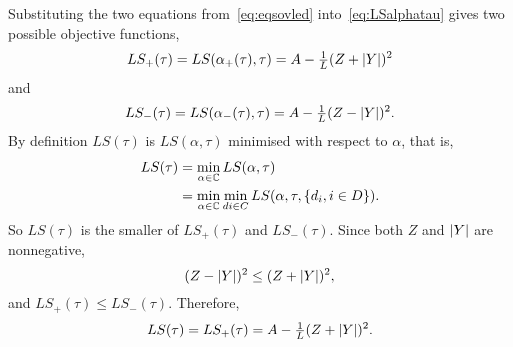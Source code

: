 \documentclass[journal]{IEEEtranTCOM}
\begin{document}
Substituting the two equations from~\eqref{eq:eqsovled} into~\eqref{eq:LSalphatau} gives two possible objective functions, %
\[
LS_+(\tau) =  LS(\alpha_+(\tau), \tau) = A - \tfrac{1}{L} (Z + {\left\vert Y \right\vert})^2
\]
and
\[
LS_-(\tau) =  LS(\alpha_{-}(\tau), \tau) = A - \tfrac{1}{L} (Z - {\left\vert Y \right\vert})^2.
\]
By definition $LS(\tau)$ is $LS(\alpha,\tau)$ minimised with respect to $\alpha$, that is,
\begin{align*}
LS(\tau) &= \min_{\alpha \in {\mathbb C}} LS(\alpha,\tau) \\
 &= \min_{\alpha \in {\mathbb C}} \min_{di \in C} LS(\alpha,\tau,\{d_i, i \in D\}).
\end{align*}
So $LS(\tau)$ is the smaller of $LS_+(\tau)$ and $LS_-(\tau)$.  Since both $Z$ and ${\left\vert Y \right\vert}$ are nonnegative,
\[
(Z - {\left\vert Y \right\vert})^2 \leq (Z + {\left\vert Y \right\vert})^2,
\]
and $LS_+(\tau) \leq LS_-(\tau)$.  Therefore,
\[
LS(\tau) = LS_+(\tau) =  A - \tfrac{1}{L} (Z + {\left\vert Y \right\vert})^2.
\]



\end{document}
